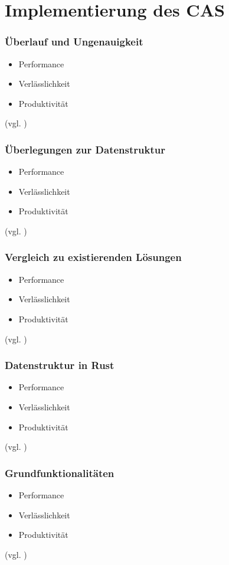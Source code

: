 \documentclass{beamer}
\begin{document}
\section{Implementierung des CAS}
\begin{frame}[fragile]
  \frametitle{Überlauf und Ungenauigkeit}
  \begin{itemize}
    \item Performance
    \pause
    \item Verlässlichkeit
    \pause
    \item Produktivität
  \end{itemize}
  {\small (vgl. \cite{WhyRust})}
\end{frame}

\begin{frame}[fragile]
  \frametitle{Überlegungen zur Datenstruktur}
  \begin{itemize}
    \item Performance
    \pause
    \item Verlässlichkeit
    \pause
    \item Produktivität
  \end{itemize}
  {\small (vgl. \cite{WhyRust})}
\end{frame}

\begin{frame}[fragile]
  \frametitle{Vergleich zu existierenden Lösungen}
  \begin{itemize}
    \item Performance
    \pause
    \item Verlässlichkeit
    \pause
    \item Produktivität
  \end{itemize}
  {\small (vgl. \cite{WhyRust})}
\end{frame}

\begin{frame}[fragile]
  \frametitle{Datenstruktur in Rust}
  \begin{itemize}
    \item Performance
    \pause
    \item Verlässlichkeit
    \pause
    \item Produktivität
  \end{itemize}
  {\small (vgl. \cite{WhyRust})}
\end{frame}

\begin{frame}[fragile]
  \frametitle{Grundfunktionalitäten}
  \begin{itemize}
    \item Performance
    \pause
    \item Verlässlichkeit
    \pause
    \item Produktivität
  \end{itemize}
  {\small (vgl. \cite{WhyRust})}
\end{frame}
\end{document}
